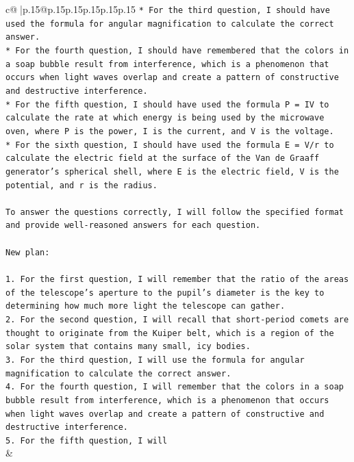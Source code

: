 \documentclass{article}
\begin{document}
{\begin{supertabular}{c@{$\;$}|p{.15\linewidth}@{}p{.15\linewidth}p{.15\linewidth}p{.15\linewidth}p{.15\linewidth}p{.15\linewidth}}
{{{\texttt{* For the third question, I should have used the formula for angular magnification to calculate the correct answer.} \\
\texttt{* For the fourth question, I should have remembered that the colors in a soap bubble result from interference, which is a phenomenon that occurs when light waves overlap and create a pattern of constructive and destructive interference.} \\
\texttt{* For the fifth question, I should have used the formula P = IV to calculate the rate at which energy is being used by the microwave oven, where P is the power, I is the current, and V is the voltage.} \\
\texttt{* For the sixth question, I should have used the formula E = V/r to calculate the electric field at the surface of the Van de Graaff generator's spherical shell, where E is the electric field, V is the potential, and r is the radius.} \\
\\ 
\texttt{To answer the questions correctly, I will follow the specified format and provide well{-}reasoned answers for each question.} \\
\\ 
\texttt{New plan:} \\
\\ 
\texttt{1. For the first question, I will remember that the ratio of the areas of the telescope's aperture to the pupil's diameter is the key to determining how much more light the telescope can gather.} \\
\texttt{2. For the second question, I will recall that short{-}period comets are thought to originate from the Kuiper belt, which is a region of the solar system that contains many small, icy bodies.} \\
\texttt{3. For the third question, I will use the formula for angular magnification to calculate the correct answer.} \\
\texttt{4. For the fourth question, I will remember that the colors in a soap bubble result from interference, which is a phenomenon that occurs when light waves overlap and create a pattern of constructive and destructive interference.} \\
\texttt{5. For the fifth question, I will} \\
            }
        }
    }
    & \\ \\

\end{supertabular}
}
\end{document}
